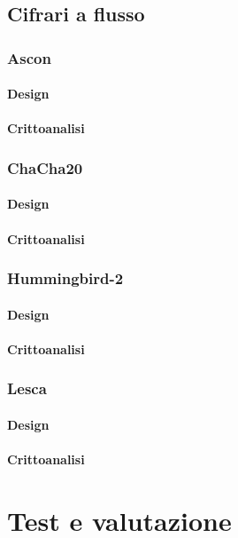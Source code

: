 \documentclass[target=bach,aauheader=,style=]{thud}
\begin{document}
	\section{Cifrari a flusso}
		\subsection{Ascon\cite{ascon}}
			\subsubsection{Design}
			\subsubsection{Crittoanalisi}
		\subsection{ChaCha20\cite{chacha20}}
			\subsubsection{Design}
			\subsubsection{Crittoanalisi}
		\subsection{Hummingbird-2\cite{hummingbird2}}
			\subsubsection{Design}
			\subsubsection{Crittoanalisi}
		\subsection{Lesca\cite{lesca}}
			\subsubsection{Design}
			\subsubsection{Crittoanalisi}
\chapter{Test e valutazione}
\end{document}
